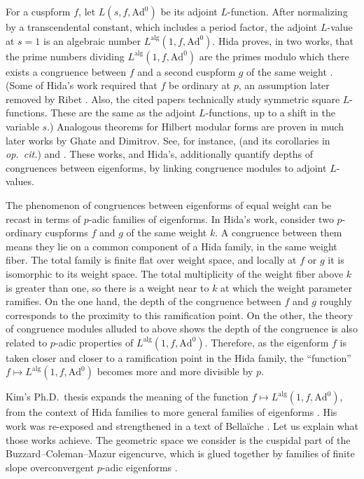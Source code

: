 \documentclass[10pt, twoside]{amsart}
\theoremstyle{plain}
\theoremstyle{definition}
\theoremstyle{remark}
\numberwithin{equation}{subsection}
\def\Ad{\mathrm{Ad}}
\def\alg{\mathrm{alg}}
\begin{document}
For a cuspform $f$, let $L(s,f,\Ad^0)$ be its adjoint $L$-function. After normalizing by a transcendental constant, which includes a period factor, the adjoint $L$-value at $s=1$ is an algebraic number $L^{\alg}(1,f,\Ad^0)$. Hida proves, in two works, that the prime numbers dividing  $L^{\alg}(1,f,\Ad^0)$ are the primes modulo which there exists a congruence between $f$ and a second cuspform $g$ of the same weight \cite{Hida-Inv63,Hida-Inv64}. (Some of Hida's work required that $f$ be ordinary at $p$, an assumption later removed by Ribet \cite{Ribet-83}. Also, the cited papers technically study symmetric square $L$-functions. These are the same as the adjoint $L$-functions, up to a shift in the variable $s$.) Analogous theorems for Hilbert modular forms are proven in much later works by Ghate and Dimitrov. See, for instance, \cite[Theorem 5]{Ghate} (and its corollaries in {\em op.\ cit.}) and \cite[Theorem A]{Dimitrov}. These works, and Hida's, additionally quantify depths of congruences between eigenforms, by linking congruence modules to adjoint $L$-values.

The phenomenon of congruences between eigenforms of equal weight can be recast in terms of $p$-adic families of eigenforms. In Hida's work, consider two $p$-ordinary cuspforms $f$ and $g$ of the same weight $k$. A congruence between them means they lie on a common component of a Hida family, in the same weight fiber. The total family is finite flat over weight space, and locally at $f$ or $g$ it is isomorphic to its weight space. The total multiplicity of the weight fiber above $k$ is greater than one, so there is a weight near to $k$ at which the weight parameter ramifies. On the one hand, the depth of the congruence between $f$ and $g$ roughly corresponds to the proximity to this ramification point. On the other, the theory of congruence modules alluded to above shows the depth of the congruence is also related to $p$-adic properties of $L^{\alg}(1,f,\Ad^0)$. Therefore, as the eigenform $f$ is taken closer and closer to a ramification point in the Hida family, the ``function'' $f \mapsto L^{\alg}(1,f,\Ad^0)$ becomes more and more divisible by $p$.

Kim's Ph.D.\ thesis expands the meaning of the function $f \mapsto L^{\alg}(1,f,\Ad^0)$, from the context of Hida families to more general families of eigenforms \cite{Kim}. His work was re-exposed and strengthened in a text of Bella\"iche \cite{Bel}. Let us explain what those works achieve. The geometric space we consider is the {{cuspidal part of the}} Buzzard--Coleman--Mazur eigencurve, which is glued together by families of finite slope overconvergent $p$-adic eigenforms \cite{ColemanMazur,Buz}. 
\end{document}
